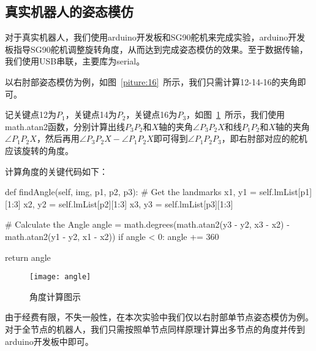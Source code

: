 \subsection{真实机器人的姿态模仿}

对于真实机器人，我们使用arduino开发板和SG90舵机来完成实验，arduino开发板指导SG90舵机调整旋转角度，从而达到完成姿态模仿的效果。至于数据传输，我们使用USB串联，主要库为serial。

以右肘部姿态模仿为例，如图~\ref{piture:16}~所示，我们只需计算12-14-16的夹角即可。

记关键点12为$P_1$，关键点14为$P_2$，关键点16为$P_3$，如图~\ref{picture:25}~所示，我们使用math.atan2函数，分别计算出线$P_3P_2$和$X$轴的夹角$\angle P_3P_2X$和线$P_1P_2$和$X$轴的夹角$\angle P_1P_2X$，然后再用$\angle P_3P_2X-\angle P_1P_2X$即可得到$\angle P_1P_2P_3$，即右肘部对应的舵机应该旋转的角度。

计算角度的关键代码如下：

\begin{python}
def findAngle(self, img, p1, p2, p3):
    # Get the landmarks
    x1, y1 = self.lmList[p1][1:3]
    x2, y2 = self.lmList[p2][1:3]
    x3, y3 = self.lmList[p3][1:3]

    # Calculate the Angle
    angle = math.degrees(math.atan2(y3 - y2, x3 - x2) -
                         math.atan2(y1 - y2, x1 - x2))
    if angle < 0:
        angle += 360
	
    return angle
\end{python}

\begin{figure}
\centering
\texttt{[image: angle]}
\caption{角度计算图示}
\label{picture:25}
\end{figure}

由于经费有限，不失一般性，在本次实验中我们仅以右肘部单节点姿态模仿为例。对于全节点的机器人，我们只需按照单节点同样原理计算出多节点的角度并传到arduino开发板中即可。

